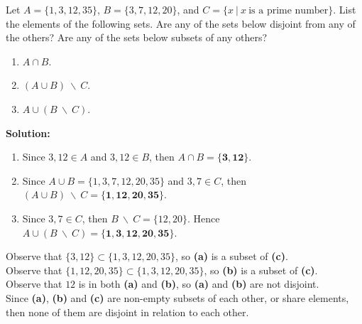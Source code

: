 Let $A = \{1,3,12,35\}$, $B = \{3,7,12,20\}$, and $C = \{x \: | \: x \: \text{is a prime number}\}$. List the elements of the following sets. Are any of the sets below disjoint from any of the others? Are any of the sets below subsets of any others?

\begin{enumerate}[label=(\alph*)]
    \item $A \cap B$.
    \item $(A \cup B) \: \backslash \: C$.
    \item $A \cup (B \: \backslash \: C)$.
\end{enumerate}

\textbf{Solution:}
\begin{enumerate}[label=(\alph*)]
\item Since $ 3,12 \in A$ and $3,12 \in B$, then $A \cap B = \bm{\{3,12\}}$.
\item Since $A \cup B = \{1,3,7,12,20,35\}$ and $3,7 \in C$, then $(A \cup B) \: \backslash \: C = \bm{\{1,12,20,35\}}$.
\item Since $3,7 \in C$, then $B \: \backslash \:C = \{12,20\}$. Hence $A \cup (B \: \backslash \: C) = \bm{\{1,3,12,20,35\}}$.
\end{enumerate}

Observe that $\{3,12\} \subset \{1,3,12,20,35\}$, so \textbf{(a)} is a subset of \textbf{(c)}.\\

Observe that $\{1,12,20,35\} \subset \{1,3,12,20,35\}$, so \textbf{(b)} is a subset of \textbf{(c)}.\\

Observe that $12$ is in both \textbf{(a)} and \textbf{(b)}, so \textbf{(a)} and \textbf{(b)} are not disjoint.\\

Since \textbf{(a)}, \textbf{(b)} and \textbf{(c)} are non-empty subsets of each other, or share elements, then none of them are disjoint in relation to each other.
\pagebreak
